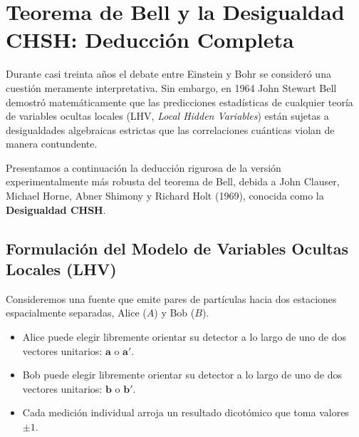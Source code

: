 \documentclass[11pt,a4paper,twoside]{report}
\theoremstyle{definition}
\theoremstyle{plain}
\theoremstyle{remark}
\begin{document}
\section{Teorema de Bell y la Desigualdad CHSH: Deducción Completa}

Durante casi treinta años el debate entre Einstein y Bohr se consideró una cuestión meramente interpretativa. Sin embargo, en 1964 John Stewart Bell demostró matemáticamente que las predicciones estadísticas de cualquier teoría de variables ocultas locales (LHV, \textit{Local Hidden Variables}) están sujetas a desigualdades algebraicas estrictas que las correlaciones cuánticas violan de manera contundente.

Presentamos a continuación la deducción rigurosa de la versión experimentalmente más robusta del teorema de Bell, debida a John Clauser, Michael Horne, Abner Shimony y Richard Holt (1969), conocida como la \textbf{Desigualdad CHSH}.

\subsection{Formulación del Modelo de Variables Ocultas Locales (LHV)}

Consideremos una fuente que emite pares de partículas hacia dos estaciones espacialmente separadas, Alice ($A$) y Bob ($B$).
\begin{itemize}
    \item Alice puede elegir libremente orientar su detector a lo largo de uno de dos vectores unitarios: $\bm{a}$ o $\bm{a}'$.
    \item Bob puede elegir libremente orientar su detector a lo largo de uno de dos vectores unitarios: $\bm{b}$ o $\bm{b}'$.
    \item Cada medición individual arroja un resultado dicotómico que toma valores $\pm 1$.
\end{itemize}
\end{document}
